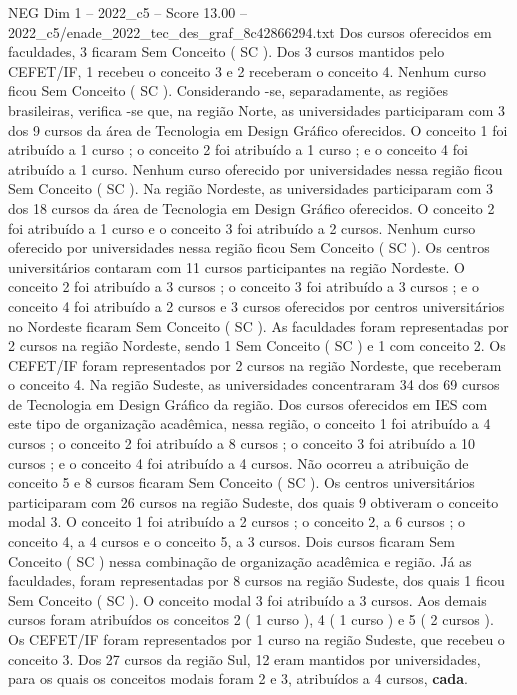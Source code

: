 \begin{textsample}{NEG Dim 1 – 2022\_c5 – Score 13.00 – 2022\_c5/enade\_2022\_tec\_des\_graf\_8c42866294.txt}
Dos cursos oferecidos em faculdades, 3 ficaram Sem Conceito ( SC ).
Dos 3 cursos mantidos pelo CEFET/IF, 1 recebeu o conceito 3 e 2 receberam o conceito 4.
Nenhum curso ficou Sem Conceito ( SC ).
Considerando -se, separadamente, as regiões brasileiras, verifica -se que, na região Norte, as universidades participaram com 3 dos 9 cursos da área de Tecnologia em Design Gráfico oferecidos.
O conceito 1 foi atribuído a 1 curso ; o conceito 2 foi atribuído a 1 curso ; e o conceito 4 foi atribuído a 1 curso.
Nenhum curso oferecido por universidades nessa região ficou Sem Conceito ( SC ).
Na região Nordeste, as universidades participaram com 3 dos 18 cursos da área de Tecnologia em Design Gráfico oferecidos.
O conceito 2 foi atribuído a 1 curso e o conceito 3 foi atribuído a 2 cursos.
Nenhum curso oferecido por universidades nessa região ficou Sem Conceito ( SC ).
Os centros universitários contaram com 11 cursos participantes na região Nordeste.
O conceito 2 foi atribuído a 3 cursos ; o conceito 3 foi atribuído a 3 cursos ; e o conceito 4 foi atribuído a 2 cursos e 3 cursos oferecidos por centros universitários no Nordeste ficaram Sem Conceito ( SC ).
As faculdades foram representadas por 2 cursos na região Nordeste, sendo 1 Sem Conceito ( SC ) e 1 com conceito 2.
Os CEFET/IF foram representados por 2 cursos na região Nordeste, que receberam o conceito 4.
Na região Sudeste, as universidades concentraram 34 dos 69 cursos de Tecnologia em Design Gráfico da região.
Dos cursos oferecidos em IES com este tipo de organização acadêmica, nessa região, o conceito 1 foi atribuído a 4 cursos ; o conceito 2 foi atribuído a 8 cursos ; o conceito 3 foi atribuído a 10 cursos ; e o conceito 4 foi atribuído a 4 cursos.
Não ocorreu a atribuição de conceito 5 e 8 cursos ficaram Sem Conceito ( SC ).
Os centros universitários participaram com 26 cursos na região Sudeste, dos quais 9 obtiveram o conceito modal 3.
O conceito 1 foi atribuído a 2 cursos ; o conceito 2, a 6 cursos ; o conceito 4, a 4 cursos e o conceito 5, a 3 cursos.
Dois cursos ficaram Sem Conceito ( SC ) nessa combinação de organização acadêmica e região.
Já as faculdades, foram representadas por 8 cursos na região Sudeste, dos quais 1 ficou Sem Conceito ( SC ).
O conceito modal 3 foi atribuído a 3 cursos.
Aos demais cursos foram atribuídos os conceitos 2 ( 1 curso ), 4 ( 1 curso ) e 5 ( 2 cursos ).
Os CEFET/IF foram representados por 1 curso na região Sudeste, que recebeu o conceito 3.
Dos 27 cursos da região Sul, 12 eram mantidos por universidades, para os quais os conceitos modais foram 2 e 3, atribuídos a 4 cursos, \textbf{cada}.

\end{textsample}
